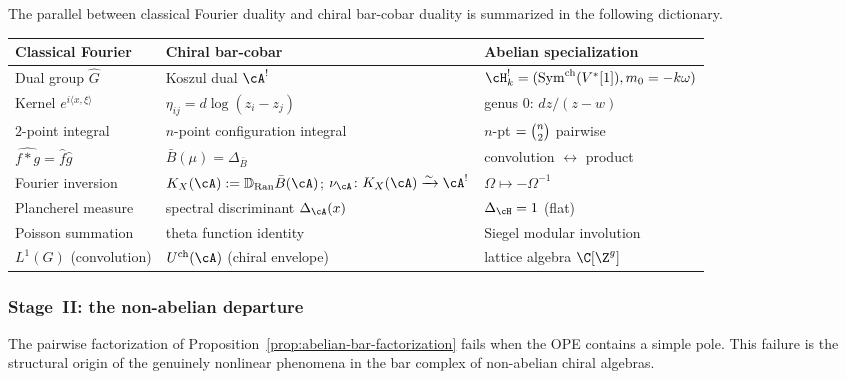 The parallel between classical Fourier duality and chiral bar-cobar
duality is summarized in the following dictionary.

\medskip
\begin{center}
\small
\renewcommand{\arraystretch}{1.35}
\begin{tabular}{@{}lll@{}}
\hline
\textbf{Classical Fourier} & \textbf{Chiral bar-cobar}
 & \textbf{Abelian specialization} \\
\hline
Dual group $\hat{G}$
 & Koszul dual $\cA^!$
 & $\cH_k^!=(\mathrm{Sym}^{\mathrm{ch}}(V^*[1]),m_0=-k\omega)$ \\[2pt]
Kernel $e^{i\langle x,\xi\rangle}$
 & $\eta_{ij} = d\log(z_i - z_j)$
 & genus $0$: $dz/(z-w)$ \\[2pt]
$2$-point integral
 & $n$-point configuration integral
 & $n$-pt $= \tbinom{n}{2}$ pairwise \\[2pt]
$\widehat{f * g} = \hat{f}\hat{g}$
 & $\bar{B}(\mu) = \Delta_{\bar{B}}$
 & convolution $\leftrightarrow$ product \\[2pt]
Fourier inversion
 & $K_X(\cA):=\mathbb{D}_{\mathrm{Ran}}\bar{B}(\cA)$;
 $\nu_{\cA}\colon K_X(\cA)\xrightarrow{\sim}\cA^!$
 & $\Omega \mapsto -\Omega^{-1}$ \\[2pt]
Plancherel measure
 & spectral discriminant $\Delta_\cA(x)$
 & $\Delta_{\cH} = 1$ (flat) \\[2pt]
Poisson summation
 & theta function identity
 & Siegel modular involution \\[2pt]
$L^1(G)$ (convolution)
 & $U^{\mathrm{ch}}(\cA)$ (chiral envelope)
 & lattice algebra $\C[\Z^g]$ \\
\hline
\end{tabular}
\end{center}
\medskip

\subsubsection{Stage~II: the non-abelian departure}

The pairwise factorization of
Proposition~\ref{prop:abelian-bar-factorization} fails when the OPE
contains a simple pole. This failure is the structural origin of
the genuinely nonlinear phenomena in the bar complex of non-abelian
chiral algebras.


